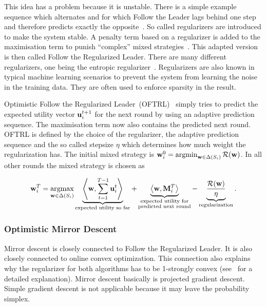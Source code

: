 \documentclass[a4paper]{article}
\theoremstyle{definition}
\newcommand{\mst}{\ensuremath{w}}
\newcommand{\mR}{\ensuremath{\mathcal{R}}}
\renewcommand{\vec}[1]{\ensuremath{{\bf #1}}}
\newcommand{\dotp}[2]{\ensuremath{\left\langle #1, #2 \right\rangle}}
\DeclareMathOperator*{\argmax}{argmax}
\DeclareMathOperator*{\argmin}{argmin}
\begin{document}
This idea has a problem because it is unstable.
There is a simple example sequence which alternates and for which Follow the
Leader lags behind one step and therefore predicts exactly the
opposite~\cite[p.127, Example 2.2]{Foundations}.
So called regularizers are introduced to make the system stable.
A penalty term based on a regularizer is added to the
maximisation term to punish \enquote{complex}
mixed strategies~\cite[p.89]{schoelkopf2002learning}.
This adapted version is then called Follow the Regularized Leader.
There are many different regularizers, one being the entropic
regularizer~\cite[p.136, Example 2.5]{Foundations}.
Regularizers are also known in typical machine learning scenarios to
prevent the system from learning the noise in the training data.
They are often used to enforce sparsity in the result.

Optimistic Follow the Regularized Leader~(OFTRL)~\cite{OMD} simply tries to predict the
expected utility vector $\vec{u}_i^{t+1}$ for the next round by using
an adaptive prediction sequence.
The maximisation term now also contains the
predicted next round.
OFTRL is defined by the choice of the regularizer, the adaptive
prediction sequence and the so called stepsize $\eta$ which determines how
much weight the regularization has.
The initial mixed strategy is $\vec{\mst}_i^0
= \argmin_{\vec{\mst}\in \Delta(S_i)} \mR(\vec{\mst})$.
In all other rounds the mixed strategy is chosen as

\begin{equation*}
 \vec{\mst}_i^T
 = \argmax_{ \vec{\mst} \in \Delta(S_i)}  \underbrace{\dotp{\vec{\mst}}{\sum_{t=1}^{T-1} \vec{u}_i^t
   }}_{\text{expected utility so far}} 
 +  \underbrace{\dotp{\vec{\mst}}{\vec{M}_i^T}}_{\substack{\text{expected
     utility for}\\ \text{predicted next round}}}
 -  \underbrace{\frac{\mR(\vec{\mst})}{\eta}}_{\text{regularization}}.
\end{equation*}


\subsubsection{Optimistic Mirror Descent}
\label{sec:optim-mirr-desc}

Mirror descent is closely connected to Follow the Regularized Leader.
It is also closely connected to online convex optimization.
This connection also explains why the regularizer for both algorithms
has to be 1-strongly convex (see~\cite{Foundations} for a detailed explanation).
Mirror descent basically is projected gradient descent.
Simple gradient descent is not applicable because it may leave the
probability simplex.
\end{document}

